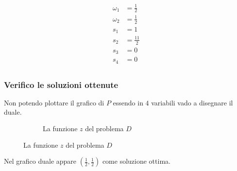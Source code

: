 \documentclass[\main/main.tex]{subfiles}
\begin{document}
\begin{align*}
  \omega_1 & = \frac{1}{2}  \\
  \omega_2 & = \frac{1}{2}  \\
  s_1      & = 1            \\
  s_2      & = \frac{11}{2} \\
  s_3      & = 0            \\
  s_4      & = 0            \\
\end{align*}

\subsubsection*{Verifico le soluzioni ottenute}
Non potendo plottare il grafico di $P$ essendo in $4$ variabili vado a disegnare il duale.

\begin{figure}
  \begin{subfigure}{0.45\textwidth}
    \caption{La funzione $z$ del problema $D$}
  \end{subfigure}
\end{figure}

Nel grafico duale appare $(\frac{1}{2}, \frac{1}{2})$ come soluzione ottima.
\end{document}
